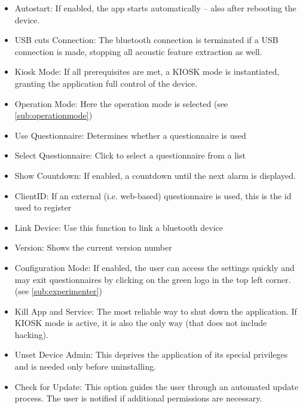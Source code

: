 \documentclass[11pt,a4paper,titlepage]{article}
\newcommand\ClrSquare[1]{\textcolor{#1}{\rule{7pt}{7pt}}}
\begin{document}
\begin{center}
\begin{tcolorbox}[colback=black!10!white,colframe=black!50!white, boxsep=1pt,left=4pt,right=14pt,top=4pt,bottom=2pt]
\begin{itemize}[label=\ClrSquare{jadeRed}]
	\item Autostart: If enabled, the app starts automatically -- also after rebooting the device.
	\item USB cuts Connection: The bluetooth connection is terminated if a USB connection is made, stopping all acoustic feature extraction as well.
	\item Kiosk Mode: If all prerequisites are met, a KIOSK mode is instantiated, granting the application full control of the device.
	\item Operation Mode: Here the operation mode is selected (see \ref{sub:operationmode})
	\item Use Questionnaire: Determines whether a questionnaire is used
	\item Select Questionnaire: Click to select a questionnaire from a list 
	\item Show Countdown: If enabled, a countdown until the next alarm is displayed. 
	\item ClientID: If an external (i.e. web-based) questionnaire is used, this is the id used to register
	\item Link Device: Use this function to link a bluetooth device 
	\item Version: Shows the current version number
	\item Configuration Mode: If enabled, the user can access the settings quickly and may exit questionnaires by clicking on the green logo in the top left corner. (see \ref{sub:experimenter})
	\item Kill App and Service: The most reliable way to shut down the application. If KIOSK mode is active, it is also the only way (that does not include hacking).
	\item Unset Device Admin: This deprives the application of its special privileges and is needed only before uninstalling. 
	\item Check for Update: This option guides the user through an automated update process. The user is notified if additional permissions are necessary.
\end{itemize}
\end{tcolorbox}
\end{center}
\end{document}
